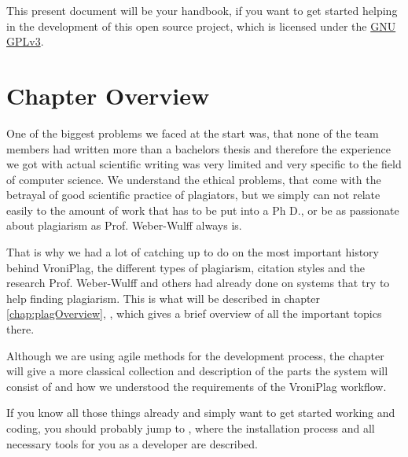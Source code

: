 This present document will be your handbook, if you want to get started helping in the development of this 
open source project, which is licensed under the \href{http://www.gnu.org/licenses/quick-guide-gplv3}{GNU GPLv3}.

\section{Chapter Overview}

One of the biggest problems we faced at the start was, that none of the team members had written more than a bachelors
thesis and therefore the experience we got with actual scientific writing was very limited and very specific to the 
field of computer science. We understand the ethical problems, that come with the betrayal of 
good scientific practice of plagiators, but we simply can not relate easily to the amount of work that has to be put into 
a Ph D., or be as 
passionate about plagiarism as Prof. Weber-Wulff always is.

That is why we had a lot of catching up to do on the most important history behind VroniPlag, the different types
of plagiarism, citation styles and the research Prof. Weber-Wulff and others had already done on systems that try to 
help finding plagiarism. This is what will be described in chapter \ref{chap:plagOverview}, , which
gives a brief overview of all the important topics there.

Although we are using agile methods for the development process, the chapter  will give
a more classical collection and description of the parts the system will consist of and how we understood the requirements of the 
VroniPlag workflow.

If you know all those things already and simply want to get started working and coding, you should probably jump
to , where the installation process and all necessary tools for you as a developer are
described.